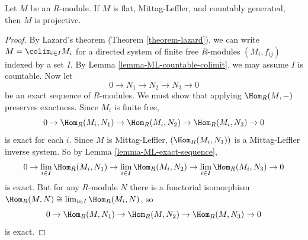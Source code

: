 \begin{lemma}
\label{lemma-countgen-projective}
Let $M$ be an $R$-module.  If $M$ is flat, Mittag-Leffler, and countably
generated, then $M$ is projective.
\end{lemma}

\begin{proof}
By Lazard's theorem (Theorem \ref{theorem-lazard}), we can write $M =
\colim_{i
\in I} M_i$ for a directed system of finite free $R$-modules $(M_i, f_{ij})$
indexed by a set $I$.  By Lemma \ref{lemma-ML-countable-colimit}, we may assume
$I$ is countable.  Now let
$$
0 \to N_1 \to N_2 \to N_3 \to 0
$$
be an exact sequence of $R$-modules.  We must show that applying
$\Hom_R(M, -)$
preserves exactness.  Since $M_i$ is finite free,
$$
0 \to \Hom_R(M_i, N_1) \to \Hom_R(M_i, N_2) \to
\Hom_R(M_i, N_3) \to 0
$$
is exact for each $i$.  Since $M$ is Mittag-Leffler, $(\Hom_R(M_i,
N_{1}))$ is
a Mittag-Leffler inverse system.  So by Lemma \ref{lemma-ML-exact-sequence},
$$
0 \to \lim_{i \in I} \Hom_R(M_i, N_1) \to
\lim_{i \in I} \Hom_R(M_i, N_2) \to
\lim_{i \in I} \Hom_R(M_i, N_3) \to 0
$$
is exact.  But for any $R$-module $N$ there is a functorial isomorphism
$\Hom_R(M, N) \cong \lim_{i \in I} \Hom_R(M_i, N)$, so
$$
0 \to \Hom_R(M, N_1) \to \Hom_R(M, N_2) \to
\Hom_R(M, N_3) \to 0
$$
is exact.
\end{proof}